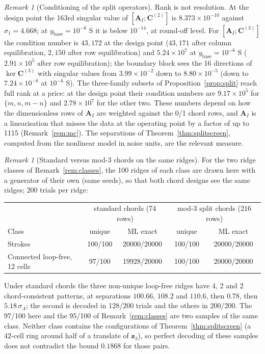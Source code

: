\documentclass[11pt,a4paper]{article}
\theoremstyle{definition}
\theoremstyle{remark}
\newtheorem{remark}[theorem]{Remark}
\begin{document}
\begin{remark}[Conditioning of the split operators]\label{rem:splitcond}
Rank is not resolution. At the design point the 163rd singular value of $[\mathbf{A}_I;\mathbf{C}^{(2)}]$ is $8.373\times10^{-10}$ against $\sigma_1 = 4.668$; at $y_{\text{base}} = 10^{-6}$ S it is below $10^{-14}$, at round-off level. For $[\mathbf{A}_I;\mathbf{C}^{(3)}]$ the condition number is $43{,}172$ at the design point ($43{,}171$ after column equilibration, $2{,}150$ after row equilibration) and $5.24\times10^{7}$ at $y_{\text{base}} = 10^{-6}$ S ($2.91\times10^{5}$ after row equilibration); the boundary block sees the 16 directions of $\ker\mathbf{C}^{(3)}$ with singular values from $3.99\times10^{-2}$ down to $8.80\times10^{-5}$ (down to $7.24\times10^{-8}$ at $10^{-6}$ S). The three-family subsets of Proposition~\ref{prop:split} reach full rank at a price: at the design point their condition numbers are $9.17\times10^{5}$ for $\{m,n,m-n\}$ and $2.78\times10^{7}$ for the other two. These numbers depend on how the dimensionless rows of $\mathbf{A}_I$ are weighted against the 0/1 chord rows, and $\mathbf{A}_I$ is a linearisation that misses the data at the operating point by a factor of up to 1115 (Remark~\ref{rem:mc}). The separations of Theorem~\ref{thm:splitscreen}, computed from the nonlinear model in noise units, are the relevant measure.
\end{remark}

\begin{remark}[Standard versus mod-3 chords on the same ridges]\label{rem:splitstudy}
For the two ridge classes of Remark~\ref{rem:classes}, the 100 ridges of each class are drawn here with a generator of their own (same seeds), so that both chord designs see the same ridges; 200 trials per ridge:
\begin{center}\small
\begin{tabular}{@{}lcccc@{}}
\toprule
& \multicolumn{2}{c}{standard chords (74 rows)} & \multicolumn{2}{c}{mod-3 split chords (216 rows)} \\
Class & unique & ML exact & unique & ML exact \\
\midrule
Strokes & 100/100 & 20000/20000 & 100/100 & 20000/20000 \\
Connected loop-free, 12 cells & 97/100 & 19928/20000 & 100/100 & 20000/20000 \\
\bottomrule
\end{tabular}
\end{center}
Under standard chords the three non-unique loop-free ridges have 4, 2 and 2 chord-consistent patterns, at separations $100.66$, $108.2$ and $110.6$, then $0.78$, then $5.18\,\sigma_\Lambda$; the second is decoded in 128/200 trials and the others in 200/200. The 97/100 here and the 95/100 of Remark~\ref{rem:classes} are two samples of the same class. Neither class contains the configurations of Theorem~\ref{thm:splitscreen} (a 42-cell ring around half of a translate of $\mathbf{z}_3$), so perfect decoding of these samples does not contradict the bound $0.1868$ for those pairs.
\end{remark}
\end{document}

